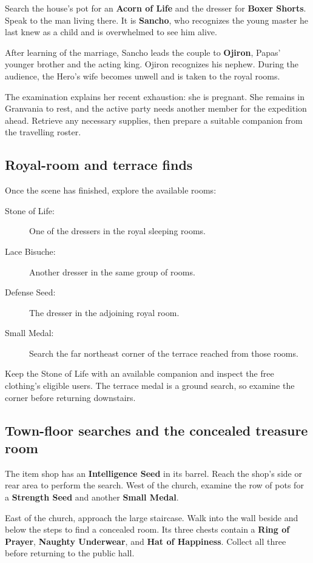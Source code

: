Search the house's pot for an \textbf{Acorn of Life} and the dresser
for \textbf{Boxer Shorts}. Speak to the man living there. It is
\textbf{Sancho}, who recognizes the young master he last knew as
a child and is overwhelmed to see him alive.

After learning of the marriage, Sancho leads the couple to
\textbf{Ojiron}, Papas' younger brother and the acting king.
Ojiron recognizes his nephew. During the audience, the Hero's wife
becomes unwell and is taken to the royal rooms.

The examination explains her recent exhaustion: she is pregnant.
She remains in Granvania to rest, and the active party needs another
member for the expedition ahead. Retrieve any necessary supplies,
then prepare a suitable companion from the travelling roster.

\subsection*{Royal-room and terrace finds}

Once the scene has finished, explore the available rooms:
\begin{description}
  \item[Stone of Life:] One of the dressers in the royal sleeping rooms.
  \item[Lace Bisuche:] Another dresser in the same group of rooms.
  \item[Defense Seed:] The dresser in the adjoining royal room.
  \item[Small Medal:] Search the far northeast corner of the terrace
    reached from those rooms.
\end{description}

Keep the Stone of Life with an available companion and inspect the
free clothing's eligible users. The terrace medal is a ground search,
so examine the corner before returning downstairs.

\subsection*{Town-floor searches and the concealed treasure room}

The item shop has an \textbf{Intelligence Seed} in its barrel.
Reach the shop's side or rear area to perform the search. West of
the church, examine the row of pots for a \textbf{Strength Seed}
and another \textbf{Small Medal}.

East of the church, approach the large staircase. Walk into the
wall beside and below the steps to find a concealed room. Its
three chests contain a \textbf{Ring of Prayer},
\textbf{Naughty Underwear}, and \textbf{Hat of Happiness}.
Collect all three before returning to the public hall.

